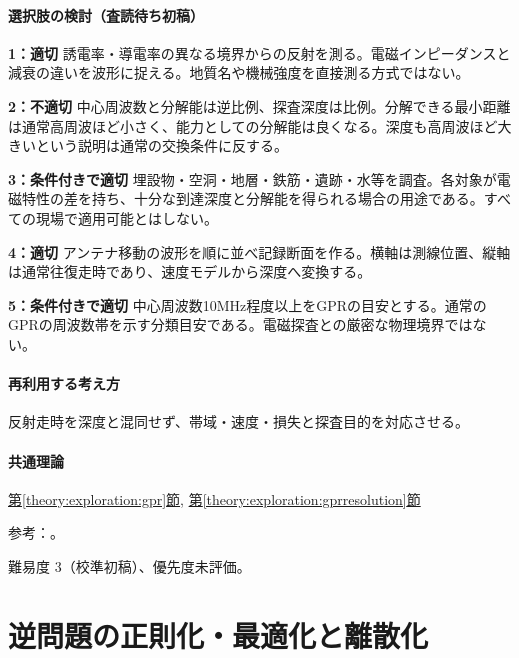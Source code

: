 \paragraph{選択肢の検討（査読待ち初稿）}\mbox{}\par

\noindent\textbf{1：適切} 誘電率・導電率の異なる境界からの反射を測る。電磁インピーダンスと減衰の違いを波形に捉える。地質名や機械強度を直接測る方式ではない。\par

\noindent\textbf{2：不適切} 中心周波数と分解能は逆比例、探査深度は比例。分解できる最小距離は通常高周波ほど小さく、能力としての分解能は良くなる。深度も高周波ほど大きいという説明は通常の交換条件に反する。\par

\noindent\textbf{3：条件付きで適切} 埋設物・空洞・地層・鉄筋・遺跡・水等を調査。各対象が電磁特性の差を持ち、十分な到達深度と分解能を得られる場合の用途である。すべての現場で適用可能とはしない。\par

\noindent\textbf{4：適切} アンテナ移動の波形を順に並べ記録断面を作る。横軸は測線位置、縦軸は通常往復走時であり、速度モデルから深度へ変換する。\par

\noindent\textbf{5：条件付きで適切} 中心周波数10MHz程度以上をGPRの目安とする。通常のGPRの周波数帯を示す分類目安である。電磁探査との厳密な物理境界ではない。\par

\paragraph{再利用する考え方} 反射走時を深度と混同せず、帯域・速度・損失と探査目的を対応させる。

\paragraph{共通理論} \hyperref[theory:exploration:gpr]{第\ref*{theory:exploration:gpr}節}, \hyperref[theory:exploration:gprresolution]{第\ref*{theory:exploration:gprresolution}節}

\par 参考：\cite{epa_gpr}。

\par 難易度 3（校準初稿）、優先度未評価。

\section{逆問題の正則化・最適化と離散化}

